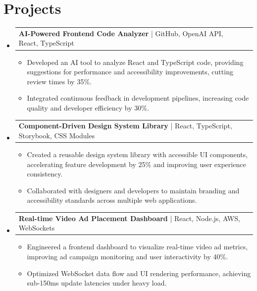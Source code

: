 \documentclass[letterpaper,11pt]{article}
\makeatletter
\newcommand{\resumeItem}[1]{
  \item\footnotesize{
    {#1 \vspace{-2pt}}
  }
}
\newcommand{\resumeProjectHeading}[2]{
    \item
    \begin{tabular*}{1.001\textwidth}{l@{\extracolsep{\fill}}r}
      \small#1 & \textbf{\small #2}\\
    \end{tabular*}\vspace{-7pt}
}
\newcommand{\resumeSubHeadingListStart}{\begin{itemize}[leftmargin=0pt, label={}]}
\newcommand{\resumeSubHeadingListEnd}{\end{itemize}}
\newcommand{\resumeItemListStart}{\begin{itemize}[leftmargin=*]}
\newcommand{\resumeItemListEnd}{\end{itemize}\vspace{-5pt}}
\makeatother
\begin{document}
\section{Projects}
    \vspace{-5pt}
    \resumeSubHeadingListStart
          \resumeProjectHeading
              {\textbf{AI-Powered Frontend Code Analyzer} | GitHub, OpenAI API, React, TypeScript}{}
        \resumeItemListStart
            \resumeItem{Developed an AI tool to analyze React and TypeScript code, providing suggestions for performance and accessibility improvements, cutting review times by 35\%.}
            \resumeItem{Integrated continuous feedback in development pipelines, increasing code quality and developer efficiency by 30\%.}
        \resumeItemListEnd
        \vspace{-12pt}
    
    \resumeProjectHeading
        {\textbf{Component-Driven Design System Library} | React, TypeScript, Storybook, CSS Modules}{}
        \resumeItemListStart
            \resumeItem{Created a reusable design system library with accessible UI components, accelerating feature development by 25\% and improving user experience consistency.}
            \resumeItem{Collaborated with designers and developers to maintain branding and accessibility standards across multiple web applications.}
        \resumeItemListEnd
          \vspace{-12pt}
      \resumeProjectHeading
          {\textbf{Real-time Video Ad Placement Dashboard} | React, Node.js, AWS, WebSockets}{}
          \resumeItemListStart
              \resumeItem{Engineered a frontend dashboard to visualize real-time video ad metrics, improving ad campaign monitoring and user interactivity by 40\%.}
              \resumeItem{Optimized WebSocket data flow and UI rendering performance, achieving sub-150ms update latencies under heavy load.}
          \resumeItemListEnd 
    \resumeSubHeadingListEnd
\end{document}
